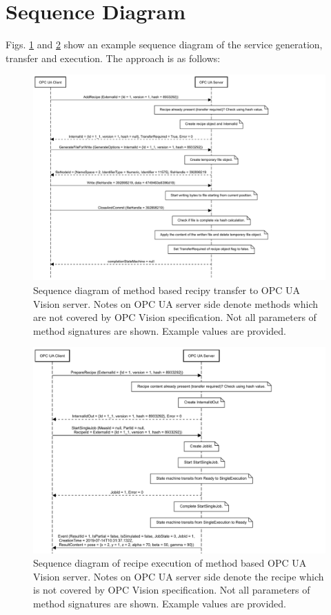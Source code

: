 \section{Sequence Diagram}
Figs. \ref{fig:runtimeviewgen} and \ref{fig:runtimeviewexec} show an example sequence diagram of the service generation, transfer and execution. The approach is as follows:
\begin{figure}
    \centering
    \includegraphics[width=1.2\textwidth]{img/OPCUAVisionAddRecipe.pdf}
    \caption[Sequence diagram of method based recipe transfer]{Sequence diagram of method based recipy transfer to OPC UA Vision server. Notes on OPC UA server side denote methods which are not covered by OPC Vision specification. Not all parameters of method signatures are shown. Example values are provided.}
    \label{fig:runtimeviewgen}
\end{figure}

\begin{figure}
    \centering
    \includegraphics[width=1.2\textwidth]{img/OPCUAVisionPrepareRecipe.pdf}
    \caption[Sequence diagram of recipe execution]{Sequence diagram of recipe execution of method based OPC UA Vision server. Notes on OPC UA server side denote the recipe which is not covered by OPC Vision specification. Not all parameters of method signatures are shown. Example values are provided.}
    \label{fig:runtimeviewexec}
\end{figure}

